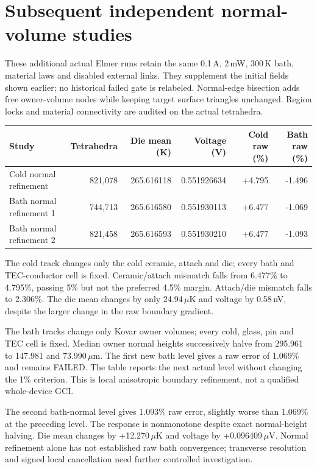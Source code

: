 \clearpage\section{Subsequent independent normal-volume studies}
These additional actual Elmer runs retain the same 0.1\,A, 2\,mW, 300\,K bath, material laws and disabled external links. They supplement the initial fields shown earlier; no historical failed gate is relabeled. Normal-edge bisection adds free owner-volume nodes while keeping target surface triangles unchanged. Region locks and material connectivity are audited on the actual tetrahedra.\par
\begin{center}\footnotesize\begin{tabular}{lrrrrr}\toprule Study & Tetrahedra & Die mean (K) & Voltage (V) & Cold raw (\%) & Bath raw (\%)\\\midrule
Cold normal refinement & 821,078 & 265.616118 & 0.551926634 & +4.795 & -1.496 \\
Bath normal refinement 1 & 744,713 & 265.616580 & 0.551930113 & +6.477 & -1.069 \\
Bath normal refinement 2 & 821,458 & 265.616593 & 0.551930210 & +6.477 & -1.093 \\
\bottomrule\end{tabular}\end{center}
The cold track changes only the cold ceramic, attach and die; every bath and TEC-conductor cell is fixed. Ceramic/attach mismatch falls from 6.477\% to 4.795\%, passing 5\% but not the preferred 4.5\% margin. Attach/die mismatch falls to 2.306\%. The die mean changes by only 24.94\,$\mu$K and voltage by 0.58\,nV, despite the larger change in the raw boundary gradient.\par
The bath tracks change only Kovar owner volumes; every cold, glass, pin and TEC cell is fixed. Median owner normal heights successively halve from 295.961 to 147.981 and 73.990\,$\mu$m. The first new bath level gives a raw error of 1.069\% and remains FAILED. The table reports the next actual level without changing the 1\% criterion. This is local anisotropic boundary refinement, not a qualified whole-device GCI.\par
The second bath-normal level gives 1.093\% raw error, slightly worse than 1.069\% at the preceding level. The response is nonmonotone despite exact normal-height halving. Die mean changes by +12.270\,$\mu$K and voltage by +0.096409\,$\mu$V. Normal refinement alone has not established raw bath convergence; transverse resolution and signed local cancellation need further controlled investigation.\par
